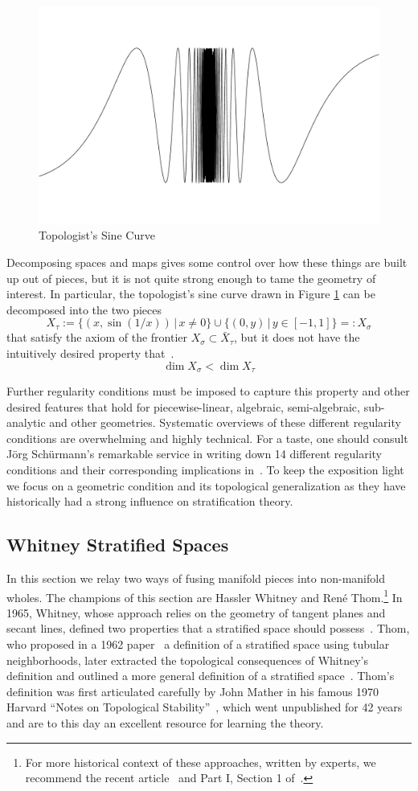 \begin{figure}
\centering
\includegraphics[width=.5\textwidth]{top_sine.pdf}
\caption{Topologist's Sine Curve}
\label{fig:top_sine}
\end{figure}

Decomposing spaces and maps gives some control over how these things are built up out of pieces, but it is not quite strong enough to tame the geometry of interest. In particular, the topologist's sine curve drawn in Figure \ref{fig:top_sine} can be decomposed into the two pieces
\[
	X_{\tau}:=\{(x,\sin(1/x))\, |\, x\neq 0 \}\cup \{(0,y)\,|\, y\in[-1,1]\}=:X_{\sigma}
\]
that satisfy the axiom of the frontier $X_{\sigma}\subset \bar{X}_{\tau}$, but it does not have the intuitively desired property that~\cite[p.131]{lu-ctst}.
\[
	\dim X_{\sigma} < \dim X_{\tau}
\]


Further regularity conditions must be imposed to capture this property and other desired features that hold for piecewise-linear, algebraic, semi-algebraic, sub-analytic and other geometries. Systematic overviews of these different regularity conditions are overwhelming and highly technical. For a taste, one should consult J\"org Sch\"urmann's remarkable service in writing down 14 different regularity conditions and their corresponding implications in~\cite[Rmk. 4.1.9]{schurmann}. To keep the exposition light we focus on a geometric condition and its topological generalization as they have historically had a strong influence on stratification theory.

\subsection{Whitney Stratified Spaces}
\label{subsubsec:whitney}

In this section we relay two ways of fusing manifold pieces into non-manifold wholes. The champions of this section are Hassler Whitney and Ren\'e Thom.\footnote{For more historical context of these approaches, written by experts, we recommend the recent article~\cite{goresky-bull} and Part I, Section 1 of~\cite{GM}.} In 1965, Whitney, whose approach relies on the geometry of tangent planes and secant lines, defined two properties that a stratified space should possess~\cite{whitney-local, whitney1965annals}. Thom, who proposed in a 1962 paper~\cite{thom-poly} a definition of a stratified space using tubular neighborhoods, later extracted the topological consequences of Whitney's definition and outlined a more general definition of a stratified space~\cite{thom-strat}. Thom's definition was first articulated carefully by John Mather in his famous 1970 Harvard ``Notes on Topological Stability''~\cite{mather}, which went unpublished for 42 years and are to this day an excellent resource for learning the theory. 

